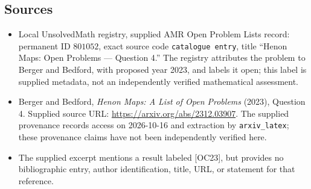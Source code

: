\documentclass[11pt]{article}
\begin{document}
\subsection{Sources}
\begin{itemize}
\item Local UnsolvedMath registry, supplied AMR Open Problem Lists record: permanent ID \(801052\), exact source code \texttt{catalogue entry}, title ``Henon Maps: Open Problems --- Question 4.'' The registry attributes the problem to Berger and Bedford, with proposed year 2023, and labels it open; this label is supplied metadata, not an independently verified mathematical assessment.
\item Berger and Bedford, \emph{Henon Maps: A List of Open Problems} (2023), Question 4. Supplied source URL: \url{https://arxiv.org/abs/2312.03907}. The supplied provenance records access on 2026-10-16 and extraction by \texttt{arxiv\_latex}; these provenance claims have not been independently verified here.
\item The supplied excerpt mentions a result labeled [OC23], but provides no bibliographic entry, author identification, title, URL, or statement for that reference.
\end{itemize}
\end{document}
